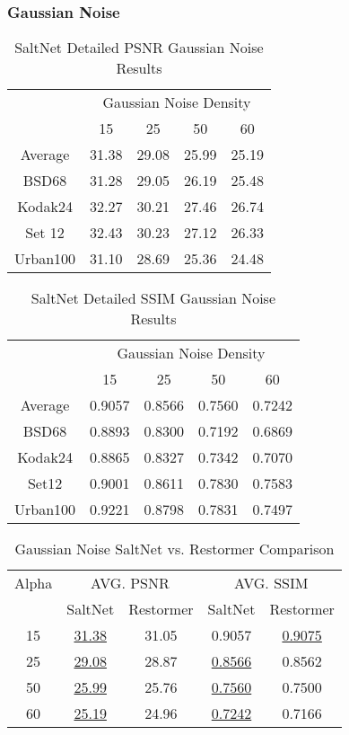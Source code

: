 \subsubsection{Gaussian Noise}


\begin{table}[!hbt]
    \centering
    \begin{tabular}{ccccc}
        \hline
        & \multicolumn{4}{c}{Gaussian Noise Density} \\
        & 15 & 25 & 50 & 60 \\
        \hline
        Average & 31.38 & 29.08 & 25.99 & 25.19 \\
        \hline
        BSD68 & 31.28 & 29.05 & 26.19 & 25.48 \\
        Kodak24 & 32.27 & 30.21 & 27.46 & 26.74 \\
        Set 12 & 32.43 & 30.23 & 27.12 & 26.33 \\
        Urban100 & 31.10 & 28.69 & 25.36 & 24.48 \\        
        \hline
    \end{tabular}
    \caption{SaltNet Detailed PSNR Gaussian Noise Results}
\end{table}

\begin{table}[!hbt]
    \centering
    \begin{tabular}{ccccc}
        \hline
        & \multicolumn{4}{c}{Gaussian Noise Density} \\
        & 15 & 25 & 50 & 60 \\
        \hline
        Average & 0.9057 & 0.8566 & 0.7560 & 0.7242 \\
        \hline
        BSD68 & 0.8893 & 0.8300 & 0.7192 & 0.6869 \\
        Kodak24 & 0.8865 & 0.8327 & 0.7342 & 0.7070 \\
        Set12 & 0.9001 & 0.8611 & 0.7830 & 0.7583 \\
        Urban100 & 0.9221 & 0.8798 & 0.7831 & 0.7497 \\
        \hline
    \end{tabular}
    \caption{SaltNet Detailed SSIM Gaussian Noise Results}
\end{table}

\begin{table}[!hbt]
    \centering
    \begin{tabular}{ccccc}
        \hline
        Alpha & \multicolumn{2}{c}{AVG. PSNR} & \multicolumn{2}{c}{AVG. SSIM} \\
            & SaltNet & Restormer & SaltNet & Restormer \\
        \hline
        15    & \underline{31.38}   & 31.05     & 0.9057  & \underline{0.9075}  \\
        25    & \underline{29.08}   & 28.87     & \underline{0.8566}  & 0.8562  \\
        50    & \underline{25.99}   & 25.76     & \underline{0.7560}  & 0.7500  \\
        60    & \underline{25.19}   & 24.96     & \underline{0.7242}  & 0.7166  \\
        \hline
    \end{tabular}
    \caption{Gaussian Noise SaltNet vs. Restormer Comparison}
\end{table}
